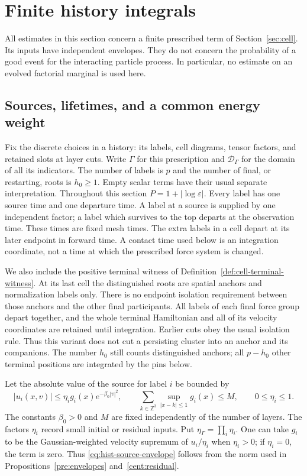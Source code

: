 \section{Finite history integrals}
\label{sec:histories}
\label{sec:history-estimates}

All estimates in this section concern a finite prescribed term of
Section~\ref{sec:cell}.  Its inputs have independent envelopes.  They do
not concern the probability of a good event for the interacting particle
process.  In particular, no estimate on an evolved factorial marginal is
used here.

\subsection{Sources, lifetimes, and a common energy weight}

Fix the discrete choices in a history: its labels, cell diagrams, tensor
factors, and retained slots at layer cuts.  Write $\Gamma$ for this
prescription and $\mathcal D_\Gamma$ for the domain of all its indicators.
The number of labels is $p$ and the number of final, or restarting, roots
is $h_0\geq1$.  Empty scalar terms have their usual separate interpretation.
Throughout this section $P=1+|\log\varepsilon|$.
Every label has one source time and one departure time.  A label at a
source is supplied by one independent factor; a label which survives to
the top departs at the observation time.  These times are fixed mesh
times.  The extra labels in a cell depart at its later endpoint in
forward time.  A contact time used below is an integration coordinate,
not a time at which the prescribed force system is changed.

We also include the positive terminal witness of
Definition~\ref{def:cell-terminal-witness}.  At its last cell the
distinguished roots are spatial anchors and normalization labels only.
There is no endpoint isolation requirement between those anchors and
the other final participants.  All labels of each final force group
depart together, and the whole terminal Hamiltonian and all of its
velocity coordinates are retained until integration.  Earlier cuts
obey the usual isolation rule.  Thus this variant does not cut a
persisting cluster into an anchor and its companions.  The number
$h_0$ still counts distinguished anchors; all $p-h_0$ other terminal
positions are integrated by the pins below.

Let the absolute value of the source for label $i$ be bounded by
\begin{equation}
 |u_i(x,v)|\leq \eta_i g_i(x)e^{-\beta_0|v|^2},\qquad
 \sum_{k\in\mathbb Z^3}\sup_{|x-k|\leq1}g_i(x)\leq M,
 \qquad 0\leq\eta_i\leq1 .
 \label{eq:hist-source-envelope}
\end{equation}
The constants $\beta_0>0$ and $M$ are fixed independently of the number
of layers.  The factors $\eta_i$ record small initial or residual
inputs.  Put $\eta_\Gamma=\prod_i\eta_i$.
One can take $g_i$ to be the Gaussian-weighted velocity supremum of
$u_i/\eta_i$ when $\eta_i>0$; if $\eta_i=0$, the term is zero. Thus
\eqref{eq:hist-source-envelope} follows from the norm used in
Propositions~\ref{pre:envelopes} and~\ref{cent:residual}.

